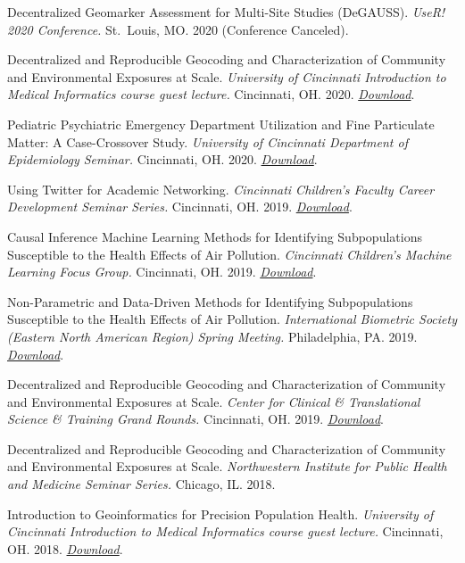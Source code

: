 Decentralized Geomarker Assessment for Multi-Site Studies (DeGAUSS).
\emph{UseR! 2020 Conference.} St.~Louis, MO. 2020 (Conference Canceled).

Decentralized and Reproducible Geocoding and Characterization of
Community and Environmental Exposures at Scale. \emph{University of
Cincinnati Introduction to Medical Informatics course guest lecture.}
Cincinnati, OH. 2020.
\emph{\href{https://colebrokamp-website.s3.us-east-1.amazonaws.com/talks/brokamp_degauss_2020_02_24.pdf}{Download}}.

Pediatric Psychiatric Emergency Department Utilization and Fine
Particulate Matter: A Case-Crossover Study. \emph{University of
Cincinnati Department of Epidemiology Seminar.} Cincinnati, OH. 2020.
\emph{\href{https://colebrokamp-website.s3.us-east-1.amazonaws.com/talks/brokamp_PM_psych_ED_2020_01_23.pdf}{Download}}.

Using Twitter for Academic Networking. \emph{Cincinnati Children's
Faculty Career Development Seminar Series.} Cincinnati, OH. 2019.
\emph{\href{https://colebrokamp-website.s3.amazonaws.com/talks/twitter_for_academia.html}{Download}}.

Causal Inference Machine Learning Methods for Identifying Subpopulations
Susceptible to the Health Effects of Air Pollution. \emph{Cincinnati
Children's Machine Learning Focus Group.} Cincinnati, OH. 2019.
\emph{\href{https://colebrokamp-website.s3.amazonaws.com/talks/brokamp_hce_2019_11_06.pdf}{Download}}.

Non-Parametric and Data-Driven Methods for Identifying Subpopulations
Susceptible to the Health Effects of Air Pollution. \emph{International
Biometric Society (Eastern North American Region) Spring Meeting.}
Philadelphia, PA. 2019.
\emph{\href{https://colebrokamp-website.s3.amazonaws.com/talks/brokamp_hce_ENAR2019.pdf}{Download}}.

Decentralized and Reproducible Geocoding and Characterization of
Community and Environmental Exposures at Scale. \emph{Center for
Clinical \& Translational Science \& Training Grand Rounds.} Cincinnati,
OH. 2019.
\emph{\href{https://colebrokamp-website.s3.amazonaws.com/talks/brokamp_degauss_2019_15MAR2019.pdf}{Download}}.

Decentralized and Reproducible Geocoding and Characterization of
Community and Environmental Exposures at Scale. \emph{Northwestern
Institute for Public Health and Medicine Seminar Series.} Chicago, IL.
2018.

Introduction to Geoinformatics for Precision Population Health.
\emph{University of Cincinnati Introduction to Medical Informatics
course guest lecture.} Cincinnati, OH. 2018.
\emph{\href{https://colebrokamp-website.s3.amazonaws.com/talks/GRAPPH_talk_informatics_2018.pdf}{Download}}.

